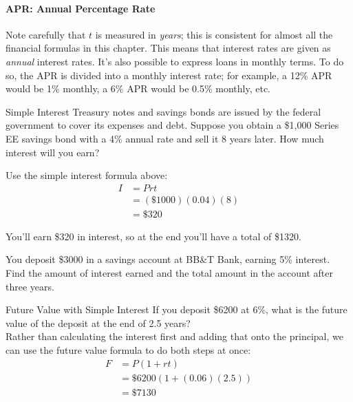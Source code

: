 \paragraph{APR: Annual Percentage Rate} Note carefully that $t$ is measured in \textit{years}; this is consistent for almost all the financial formulas in this chapter.  This means that interest rates are given as \textit{annual} interest rates.  It's also possible to express loans in monthly terms.  To do so, the APR is divided into a monthly interest rate; for example, a 12\% APR would be 1\% monthly, a 6\% APR would be 0.5\% monthly, etc.

\begin{example}[https://www.youtube.com/watch?v=TJqhAMb2T6Q]{Simple Interest}
Treasury notes and savings bonds are issued by the federal government to cover its expenses and debt.
Suppose you obtain a \$1,000 Series EE savings bond with a 4\% annual rate and sell it 8 years later. How much interest will you earn?\\
\vspace{0.2in}

Use the simple interest formula above:
\begin{align*}
I &= Prt\\
&= (\$1000)(0.04)(8)\\
&= \$320
\end{align*}

You'll earn \$320 in interest, so at the end you'll have a total of \$1320.
\end{example}

\begin{try}
You deposit \$3000 in a savings account at BB\&T Bank, earning 5\% interest.  Find the amount of interest earned and the total amount in the account after three years.
\end{try}

\begin{example}[https://www.youtube.com/watch?v=T4BcmTGwJCI]{Future Value with Simple Interest}
If you deposit \$6200 at 6\%, what is the future value of the deposit at the end of 2.5 years?\\

Rather than calculating the interest first and adding that onto the principal, we can use the future value formula to do both steps at once:
\begin{align*}
F &= P(1+rt)\\
&= \$6200(1+(0.06)(2.5))\\
&= \$7130
\end{align*}
\end{example}


